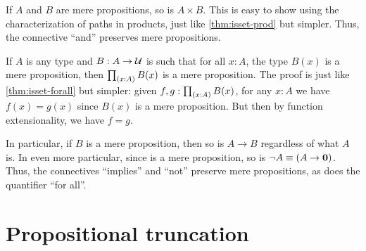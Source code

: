 \documentclass[hott-all.tex]{subfiles}
\begin{document}
\begin{eg}
  If $A$ and $B$ are mere propositions, so is $A\times B$.
  This is easy to show using the characterization of paths in products, just like \cref{thm:isset-prod} but simpler.
  Thus, the connective ``and'' preserves mere propositions.
\end{eg}

\begin{eg}
  If $A$ is any type and $B:A\to \mathcal{U}$ is such that for all $x:A$, the type $B(x)$ is a mere proposition, then $\prd{x:A} B(x)$ is a mere proposition.
  The proof is just like \cref{thm:isset-forall} but simpler: given $f,g:\prd{x:A} B(x)$, for any $x:A$ we have $f(x)=g(x)$ since $B(x)$ is a mere proposition.
  But then by function extensionality, we have $f=g$.

  In particular, if $B$ is a mere proposition, then so is $A\to B$ regardless of what $A$ is.
  In even more particular, since \emptyt is a mere proposition, so is $\neg A \equiv (A\to\mathbf{0})$.
  Thus, the connectives ``implies'' and ``not'' preserve mere propositions, as does the quantifier ``for all''.
\end{eg}
%
%
%

\section{Propositional truncation}
\end{document}

